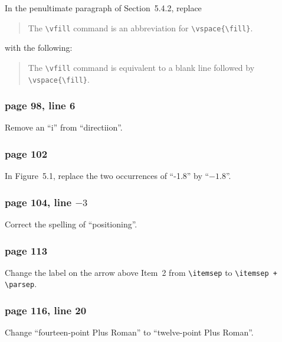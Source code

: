 In the penultimate paragraph of Section~5.4.2, replace 
\begin{quote}
The \verb|\vfill| command is an abbreviation for \verb|\vspace{\fill}|.
\end{quote}
with the following:
\begin{quote}
The \verb|\vfill| command is equivalent to a blank line followed by
\verb|\vspace{\fill}|.
\end{quote}

\subsubsection*{page 98, line 6}

Remove an ``i'' from ``directiion''. 

\subsubsection*{page 102}
In Figure~5.1, replace the two occurrences of ``-1.8'' by
``$-1.8$''.

\subsubsection*{page 104, line $-3$}
Correct the spelling of ``positioning''.


\subsubsection*{page 113}
{\sloppy Change the label on the arrow above Item~2 from \verb|\itemsep| to
\verb|\itemsep + \parsep|.\par}


\subsubsection*{page 116, line 20}

Change ``fourteen-point Plus Roman'' to ``twelve-point Plus Roman''.

